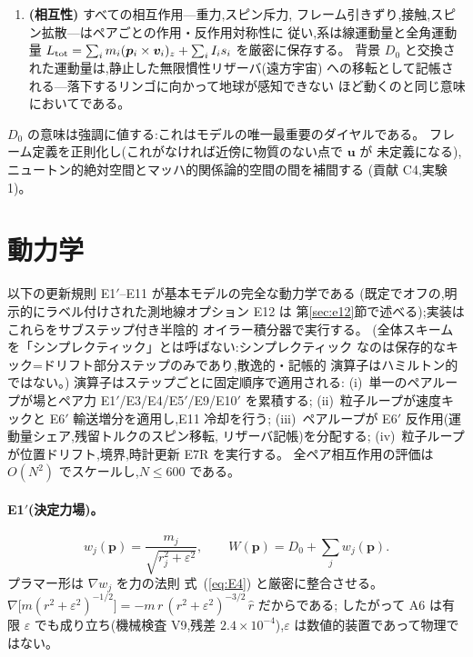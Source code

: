 \documentclass[a4paper,10pt,twocolumn]{ltjsarticle}
\newcommand{\vect}[1]{\bm{#1}}
\newcommand{\Dz}{D_0}
\begin{document}
\begin{enumerate}
\item[A13.]{\bf (相互性)} すべての相互作用---重力,スピン斥力,
フレーム引きずり,接触,スピン拡散---はペアごとの作用・反作用対称性に
従い,系は線運動量と全角運動量
$L_{\rm tot} = \sum_i m_i(\vect{p}_i\times\vect{v}_i)_z
 + \sum_i I_i s_i$ を厳密に保存する。
背景 $\Dz$ と交換された運動量は,静止した無限慣性リザーバ(遠方宇宙)
への移転として記帳される---落下するリンゴに向かって地球が感知できない
ほど動くのと同じ意味においてである。
\end{enumerate}

$\Dz$ の意味は強調に値する:これはモデルの唯一最重要のダイヤルである。
フレーム定義を正則化し(これがなければ近傍に物質のない点で $\vect{u}$ が
未定義になる),ニュートン的絶対空間とマッハ的関係論的空間の間を補間する
(貢献 C4,実験1)。

\section{動力学}
\label{sec:dynamics}

以下の更新規則 E1$'$--E11 が基本モデルの完全な動力学である
(既定でオフの,明示的にラベル付けされた測地線オプション E12 は
第\ref{sec:e12}節で述べる);実装はこれらをサブステップ付き半陰的
オイラー積分器で実行する。
(全体スキームを「シンプレクティック」とは呼ばない:シンプレクティック
なのは保存的なキック=ドリフト部分ステップのみであり,散逸的・記帳的
演算子はハミルトン的ではない。)
演算子はステップごとに固定順序で適用される:
(i)~単一のペアループが場とペア力 E1$'$/E3/E4/E5$'$/E9/E10$'$ を累積する;
(ii)~粒子ループが速度キックと E6$'$ 輸送増分を適用し,E11 冷却を行う;
(iii)~ペアループが E6$'$ 反作用(運動量シェア,残留トルクのスピン移転,
リザーバ記帳)を分配する;
(iv)~粒子ループが位置ドリフト,境界,時計更新 E7R を実行する。
全ペア相互作用の評価は $O(N^2)$ でスケールし,$N \le 600$ である。

\paragraph*{E1$'$(決定力場)。}
\begin{equation}
w_j(\vect{p}) = \frac{m_j}{\sqrt{r_j^2+\varepsilon^2}},\qquad
W(\vect{p}) = \Dz + \sum_j w_j(\vect{p}).
\label{eq:E1}
\end{equation}
プラマー形は $\nabla w_j$ を力の法則 式~(\ref{eq:E4}) と厳密に整合させる。
$\nabla\bigl[m(r^2+\varepsilon^2)^{-1/2}\bigr]
 = -m\,r\,(r^2+\varepsilon^2)^{-3/2}\,\hat{r}$ だからである;
したがって A6 は有限 $\varepsilon$ でも成り立ち(機械検査 V9,残差
$2.4\times10^{-4}$),$\varepsilon$ は数値的装置であって物理ではない。
\end{document}
